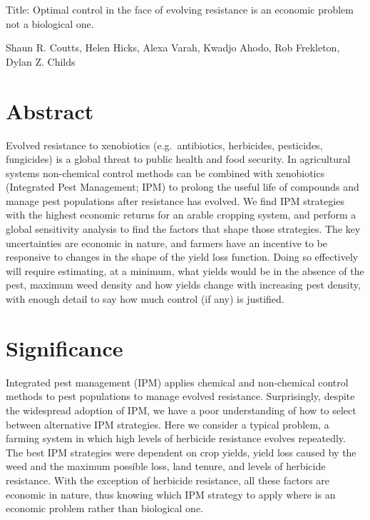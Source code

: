 \documentclass[12pt, a4paper]{article}
\begin{document}
Title: Optimal control in the face of evolving resistance is an economic problem not a biological one.

Shaun R. Coutts, Helen Hicks, Alexa Varah, Kwadjo Ahodo, Rob Frekleton, Dylan Z. Childs 

\newpage

\section*{Abstract}
Evolved resistance to xenobiotics (e.g.\ antibiotics, herbicides, pesticides, fungicides) is a global threat to public health and food security. In agricultural systems non-chemical control methods can be combined with xenobiotics (Integrated Pest Management; IPM) to prolong the useful life of compounds and manage pest populations after resistance has evolved. We find IPM strategies with the highest economic returns for an arable cropping system, and perform a global sensitivity analysis to find the factors that shape those strategies. The key uncertainties are economic in nature, and farmers have an incentive to be responsive to changes in the shape of the yield loss function. Doing so effectively will require estimating, at a minimum, what yields would be in the absence of the pest, maximum weed density and how yields change with increasing pest density, with enough detail to say how much control (if any) is justified.

\section*{Significance}
Integrated pest management (IPM) applies chemical and non-chemical control methods to pest populations to manage evolved resistance. Surprisingly, despite the widespread adoption of IPM, we have a poor understanding of how to select between alternative IPM strategies. Here we consider a typical problem, a farming system in which high levels of herbicide resistance evolves repeatedly. The best IPM strategies were dependent on crop yields, yield loss caused by the weed and the maximum possible loss, land tenure, and levels of herbicide resistance. With the exception of herbicide resistance, all these factors are economic in nature, thus knowing which IPM strategy to apply where is an economic problem rather than biological one.

\newpage
\end{document}

